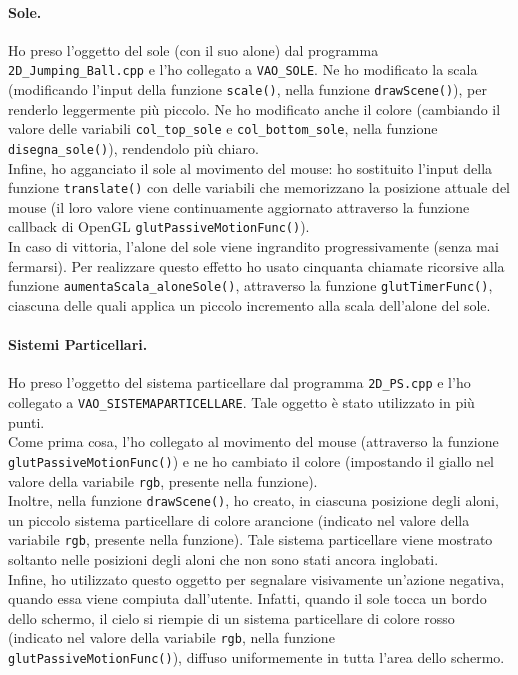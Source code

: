\documentclass[a4paper, 12pt]{article}
\begin{document}
\paragraph{Sole.}
Ho preso l'oggetto del sole (con il suo alone) dal programma \texttt{2D\allowbreak\_Jumping\_Ball.cpp} e l'ho collegato a \texttt{VAO\_SOLE}. Ne ho modificato la scala (modificando l'input della funzione \texttt{scale()}, nella funzione \texttt{drawScene()}), per renderlo leggermente più piccolo. Ne ho modificato anche il colore (cambiando il valore delle variabili \texttt{col\_top\_sole} e \texttt{col\_bottom\_sole}, nella funzione \texttt{disegna\_sole()}), rendendolo più chiaro.\\
Infine, ho agganciato il sole al movimento del mouse: ho sostituito l'input della funzione \texttt{translate()} con delle variabili che memorizzano la posizione attuale del mouse (il loro valore viene continuamente aggiornato attraverso la funzione callback di OpenGL \texttt{glutPassiveMotionFunc()}).\\
In caso di vittoria, l'alone del sole viene ingrandito progressivamente (senza mai fermarsi). Per realizzare questo effetto ho usato cinquanta chiamate ricorsive alla funzione \texttt{aumentaScala\_aloneSole()}, attraverso la funzione \texttt{glutTimerFunc()}, ciascuna delle quali applica un piccolo incremento alla scala dell'alone del sole.

\paragraph{Sistemi Particellari.}
Ho preso l'oggetto del sistema particellare dal programma \texttt{2D\_PS.cpp} e l'ho collegato a \texttt{VAO\_SISTEMAPARTICELLARE}. Tale oggetto è stato utilizzato in più punti.\\
Come prima cosa, l'ho collegato al movimento del mouse (attraverso la funzione \texttt{glutPassiveMotionFunc()}) e ne ho cambiato il colore (impostando il giallo nel valore della variabile \texttt{rgb}, presente nella funzione).\\
Inoltre, nella funzione \texttt{drawScene()}, ho creato, in ciascuna posizione degli aloni, un piccolo sistema particellare di colore arancione (indicato nel valore della variabile \texttt{rgb}, presente nella funzione). Tale sistema particellare viene mostrato soltanto nelle posizioni degli aloni che non sono stati ancora inglobati.\\
Infine, ho utilizzato questo oggetto per segnalare visivamente un'azione negativa, quando essa viene compiuta dall'utente. Infatti, quando il sole tocca un bordo dello schermo, il cielo si riempie di un sistema particellare di colore rosso (indicato nel valore della variabile \texttt{rgb}, nella funzione \texttt{glutPassiveMotionFunc()}), diffuso uniformemente in tutta l'area dello schermo.


\end{document}
